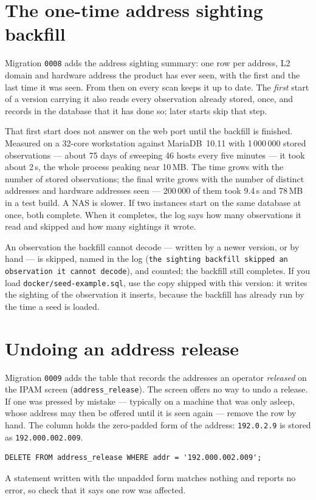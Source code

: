 \documentclass[11pt,oneside,listof=totoc,bibliography=totoc]{scrreprt}
\begin{document}
\section{The one-time address sighting backfill}
Migration \texttt{0008} adds the address sighting summary: one row per address, L2 domain and
hardware address the product has ever seen, with the first and the last time it was seen. From
then on every scan keeps it up to date. The \emph{first} start of a version carrying it also reads
every observation already stored, once, and records in the database that it has done so; later
starts skip that step.

\begin{warning}
That first start does not answer on the web port until the backfill is finished. Measured on a
32-core workstation against MariaDB~10.11 with 1\,000\,000 stored observations --- about 75 days of
sweeping 46 hosts every five minutes --- it took about 2\,s, the whole process peaking near 10\,MB.
The time grows with the number of stored observations; the final write grows with the number of
distinct addresses and hardware addresses seen --- 200\,000 of them took 9.4\,s and 78\,MB in a
test build. A NAS is slower. If two instances start on the same database at once, both complete. When it completes, the log says how many observations it read and
skipped and how many sightings it wrote.
\end{warning}

\begin{note}
An observation the backfill cannot decode --- written by a newer version, or by hand --- is skipped,
named in the log (\texttt{the sighting backfill skipped an observation it cannot decode}), and
counted; the backfill still completes. If you load \texttt{docker/seed-example.sql}, use the copy
shipped with this version: it writes the sighting of the observation it inserts, because the
backfill has already run by the time a seed is loaded.
\end{note}

\section{Undoing an address release}
Migration \texttt{0009} adds the table that records the addresses an operator \emph{released} on the
IPAM screen (\texttt{address\_release}). The screen offers no way to undo a release. If one was
pressed by mistake --- typically on a machine that was only asleep, whose address may then be offered
until it is seen again --- remove the row by hand. The column holds the zero-padded form of the
address: \texttt{192.0.2.9} is stored as \texttt{192.000.002.009}.
\begin{verbatim}
DELETE FROM address_release WHERE addr = '192.000.002.009';
\end{verbatim}
A statement written with the unpadded form matches nothing and reports no error, so check that it
says one row was affected.
\end{document}

